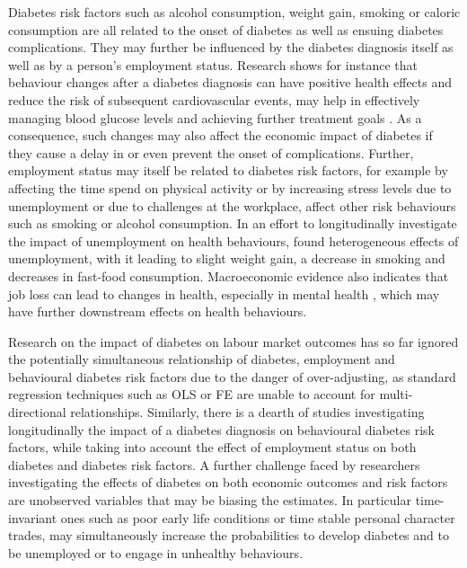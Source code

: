 Diabetes risk factors such as alcohol consumption, weight gain, smoking or caloric consumption are all related to the onset of diabetes as well as ensuing diabetes complications. They may further be influenced by the diabetes diagnosis itself as well as by a person's employment status. Research shows for instance that behaviour changes after a diabetes diagnosis can have positive health effects and reduce the risk of subsequent cardiovascular events\parencite{Long2014}, may help in effectively managing blood glucose levels and achieving further treatment goals \parencite{Zhou2016}. As a consequence, such changes may also affect the economic impact of diabetes if they cause a delay in or even prevent the onset of complications. Further, employment status may itself be related to diabetes risk factors, for example by affecting the time spend on physical activity or by increasing stress levels due to unemployment or due to challenges at the workplace, affect other risk behaviours such as smoking or alcohol consumption. In an effort to longitudinally investigate the impact of unemployment on health behaviours, \textcite{Colman2014} found heterogeneous effects of unemployment, with it leading to slight weight gain, a decrease in smoking and decreases in fast-food consumption. Macroeconomic evidence also indicates that job loss can lead to changes in health, especially in mental health \parencite{Charles2008}, which may have further downstream effects on health behaviours.

Research on the impact of diabetes on labour market outcomes has so far ignored the potentially simultaneous relationship of diabetes, employment and behavioural diabetes risk factors due to the danger of over-adjusting, as standard regression techniques such as \ac{OLS} or \ac{FE} are unable to account for multi-directional relationships. Similarly, there is a dearth of studies investigating longitudinally the impact of a diabetes diagnosis on behavioural diabetes risk factors, while taking into account the effect of employment status on both diabetes and diabetes risk factors. A further challenge faced by researchers investigating the effects of diabetes on both economic outcomes and risk factors are unobserved variables that may be biasing the estimates. In particular time-invariant ones such as poor early life conditions or time stable personal character trades, may simultaneously increase the probabilities to develop diabetes and to be unemployed or to engage in unhealthy behaviours. 

